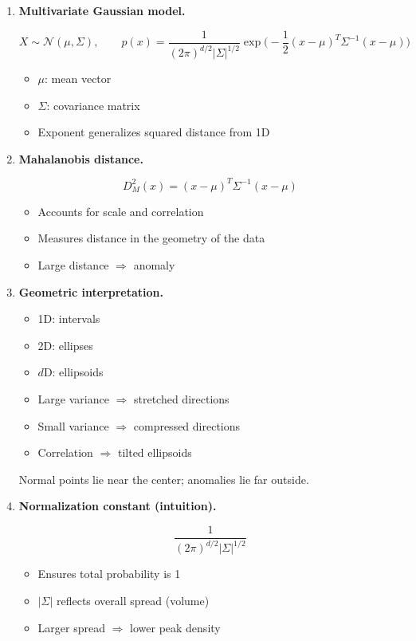 \documentclass{article}
\begin{document}
\begin{enumerate}
\item \textbf{Multivariate Gaussian model.}

\[
X \sim \mathcal{N}(\mu, \Sigma), \qquad
p(x) = \frac{1}{(2\pi)^{d/2} |\Sigma|^{1/2}}
\exp\Bigg(-\frac{1}{2}(x-\mu)^T \Sigma^{-1}(x-\mu)\Bigg)
\]

\begin{itemize}
    \item \( \mu \): mean vector
    \item \( \Sigma \): covariance matrix
    \item Exponent generalizes squared distance from 1D
\end{itemize}

\item \textbf{Mahalanobis distance.}

\[
D_M^2(x) = (x-\mu)^T \Sigma^{-1}(x-\mu)
\]

\begin{itemize}
    \item Accounts for scale and correlation
    \item Measures distance in the geometry of the data
    \item Large distance \( \Rightarrow \) anomaly
\end{itemize}

\item \textbf{Geometric interpretation.}

\begin{itemize}
    \item 1D: intervals
    \item 2D: ellipses
    \item \(d\)D: ellipsoids
\end{itemize}

\begin{itemize}
    \item Large variance $\Rightarrow$ stretched directions
    \item Small variance $\Rightarrow$ compressed directions
    \item Correlation $\Rightarrow$ tilted ellipsoids
\end{itemize}

Normal points lie near the center; anomalies lie far outside.

\item \textbf{Normalization constant (intuition).}

\[
\frac{1}{(2\pi)^{d/2} |\Sigma|^{1/2}}
\]

\begin{itemize}
    \item Ensures total probability is 1
    \item \( |\Sigma| \) reflects overall spread (volume)
    \item Larger spread $\Rightarrow$ lower peak density
\end{itemize}


\end{enumerate}
\end{document}
